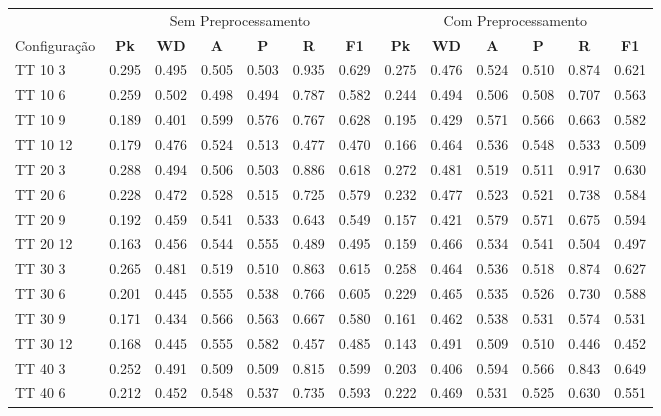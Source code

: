 \documentclass{article}
\begin{document}
 
\begin{longtable}[c]{|l|c|c|c|c|c|c||c|c|c|c|c|c|} 
\hline 
&\multicolumn{6}{c||}{Sem Preprocessamento} & \multicolumn{6}{c|}{Com Preprocessamento}\\ 
Configuração & \textbf{Pk} & \textbf{WD} & \textbf{A } & \textbf{P } & \textbf{R } & \textbf{F1} & \textbf{Pk} & \textbf{WD} & \textbf{A } & \textbf{P } & \textbf{R } & \textbf{F1}\\ \hline





TT 10  3 & 0.295 & 0.495 & 0.505 & 0.503 & 0.935 & 0.629 & 0.275 & 0.476 & 0.524 & 0.510 & 0.874 & 0.621\\ \hline
TT 10  6 & 0.259 & 0.502 & 0.498 & 0.494 & 0.787 & 0.582 & 0.244 & 0.494 & 0.506 & 0.508 & 0.707 & 0.563\\ \hline
TT 10  9 & 0.189 & 0.401 & 0.599 & 0.576 & 0.767 & 0.628 & 0.195 & 0.429 & 0.571 & 0.566 & 0.663 & 0.582\\ \hline
TT 10 12 & 0.179 & 0.476 & 0.524 & 0.513 & 0.477 & 0.470 & 0.166 & 0.464 & 0.536 & 0.548 & 0.533 & 0.509\\ \hline
TT 20  3 & 0.288 & 0.494 & 0.506 & 0.503 & 0.886 & 0.618 & 0.272 & 0.481 & 0.519 & 0.511 & 0.917 & 0.630\\ \hline
TT 20  6 & 0.228 & 0.472 & 0.528 & 0.515 & 0.725 & 0.579 & 0.232 & 0.477 & 0.523 & 0.521 & 0.738 & 0.584\\ \hline
TT 20  9 & 0.192 & 0.459 & 0.541 & 0.533 & 0.643 & 0.549 & 0.157 & 0.421 & 0.579 & 0.571 & 0.675 & 0.594\\ \hline
TT 20 12 & 0.163 & 0.456 & 0.544 & 0.555 & 0.489 & 0.495 & 0.159 & 0.466 & 0.534 & 0.541 & 0.504 & 0.497\\ \hline
TT 30  3 & 0.265 & 0.481 & 0.519 & 0.510 & 0.863 & 0.615 & 0.258 & 0.464 & 0.536 & 0.518 & 0.874 & 0.627\\ \hline
TT 30  6 & 0.201 & 0.445 & 0.555 & 0.538 & 0.766 & 0.605 & 0.229 & 0.465 & 0.535 & 0.526 & 0.730 & 0.588\\ \hline
TT 30  9 & 0.171 & 0.434 & 0.566 & 0.563 & 0.667 & 0.580 & 0.161 & 0.462 & 0.538 & 0.531 & 0.574 & 0.531\\ \hline
TT 30 12 & 0.168 & 0.445 & 0.555 & 0.582 & 0.457 & 0.485 & 0.143 & 0.491 & 0.509 & 0.510 & 0.446 & 0.452\\ \hline
TT 40  3 & 0.252 & 0.491 & 0.509 & 0.509 & 0.815 & 0.599 & 0.203 & 0.406 & 0.594 & 0.566 & 0.843 & 0.649\\ \hline
TT 40  6 & 0.212 & 0.452 & 0.548 & 0.537 & 0.735 & 0.593 & 0.222 & 0.469 & 0.531 & 0.525 & 0.630 & 0.551\\ \hline

\end{longtable}
\end{document}
